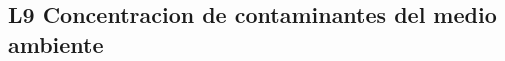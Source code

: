 \documentclass[12pt,addpoints,answers]{evalua}
\begin{document}
\begin{questions}
	\section*{L9 Concentracion de contaminantes del medio ambiente}










\end{questions}
\end{document}
